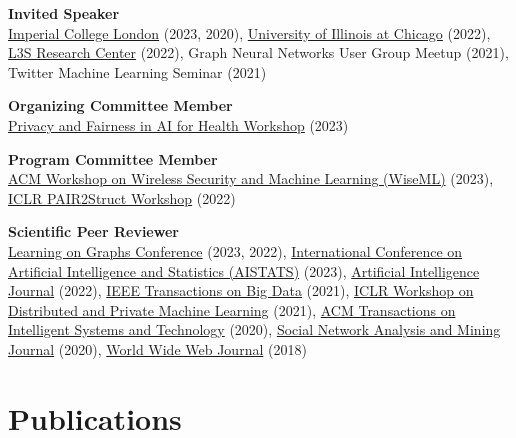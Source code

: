 \documentclass[11pt]{article}
\begin{document}
\begin{outerlist}
  \item \textbf{Invited Speaker}\\
  \href{https://www.imperial.ac.uk/}{Imperial College London} (2023, 2020), \href{https://www.uic.edu/}{University of Illinois at Chicago} (2022), \href{https://www.l3s.de/}{L3S Research Center} (2022), Graph Neural Networks User Group Meetup (2021), Twitter Machine Learning Seminar (2021)

	\item \textbf{Organizing Committee Member}\\
	\href{https://priv-fair-ai-uk.github.io}{Privacy and Fairness in AI for Health Workshop} (2023)

	\item \textbf{Program Committee Member}\\
	\href{https://wisec2023.surrey.ac.uk/wiseml2023/}{ACM Workshop on Wireless Security and Machine Learning (WiseML)} (2023),
	\href{https://pair2struct-workshop.github.io/}{ICLR PAIR2Struct Workshop} (2022)

	\item \textbf{Scientific Peer Reviewer}\\
	\href{https://logconference.org/}{Learning on Graphs Conference} (2023, 2022),
  \href{http://aistats.org/aistats2023/}{International Conference on Artificial Intelligence and Statistics (AISTATS)} (2023),
	\href{https://www.journals.elsevier.com/artificial-intelligence}{Artificial Intelligence Journal} (2022),
	\href{https://ieeexplore.ieee.org/xpl/RecentIssue.jsp?punumber=6687317}{IEEE Transactions on Big Data} (2021),
	\href{https://dp-ml.github.io/2021-workshop-ICLR/}{ICLR Workshop on Distributed and Private Machine Learning} (2021),
	\href{https://dl.acm.org/journal/tist}{ACM Transactions on Intelligent Systems and Technology} (2020),
	\href{https://www.springer.com/journal/13278}{Social Network Analysis and Mining Journal} (2020),
	\href{https://www.springer.com/journal/11280}{World Wide Web Journal} (2018)

\end{outerlist}

\section{Publications}
\end{document}
